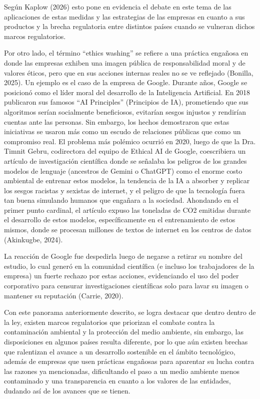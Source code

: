 \documentclass[stu,12pt,a4paper]{apa7}
\begin{document}
Según Kaplow (2026) esto pone en evidencia el debate en este tema de las aplicaciones de estas medidas y las estrategias de las empresas en cuanto a sus productos y la brecha regulatoria entre distintos países cuando se vulneran dichos marcos regulatorios.

Por otro lado, el término ``ethics washing'' se refiere a una práctica engañosa en donde las empresas exhiben una imagen pública de responsabilidad moral y de valores éticos, pero que en sus acciones internas reales no se ve reflejado (Bonilla, 2025). Un ejemplo es el caso de la empresa de Google. Durante años, Google se posicionó como el líder moral del desarrollo de la Inteligencia Artificial. En 2018 publicaron sus famosos ``AI Principles'' (Principios de IA), prometiendo que sus algoritmos serían socialmente beneficiosos, evitarían sesgos injustos y rendirían cuentas ante las personas. Sin embargo, los hechos demostraron que estas iniciativas se usaron más como un escudo de relaciones públicas que como un compromiso real. El problema más polémico ocurrió en 2020, luego de que la Dra. Timnit Gebru, codirectora del equipo de Ethical AI de Google, coescribiera un artículo de investigación científica donde se señalaba los peligros de los grandes modelos de lenguaje (ancestros de Gemini o ChatGPT) como el enorme costo ambiental de entrenar estos modelos, la tendencia de la IA a absorber y replicar los sesgos racistas y sexistas de internet, y el peligro de que la tecnología fuera tan buena simulando humanos que engañara a la sociedad. Ahondando en el primer punto cardinal, el artículo expuso las toneladas de CO2 emitidas durante el desarrollo de estos modelos, específicamente en el entrenamiento de estos mismos, donde se procesan millones de textos de internet en los centros de datos (Akinkugbe, 2024).

La reacción de Google fue despedirla luego de negarse a retirar su nombre del estudio, lo cual generó en la comunidad científica (e incluso los trabajadores de la empresa) un fuerte rechazo por estas acciones, evidenciando el uso del poder corporativo para censurar investigaciones científicas solo para lavar su imagen o mantener su reputación (Carrie, 2020).

Con este panorama anteriormente descrito, se logra destacar que dentro dentro de la ley, existen marcos regulatorios que priorizan el combate contra la contaminación ambiental y la protección del medio ambiente, sin embargo, las disposiciones en algunos países resulta diferente, por lo que aún existen brechas que ralentizan el avance a un desarrollo sostenible en el ámbito tecnológico, además de empresas que usen prácticas engañosas para aparentar su lucha contra las razones ya mencionadas, dificultando el paso a un medio ambiente menos contaminado y una transparencia en cuanto a los valores de las entidades, dudando así de los avances que se tienen.
\end{document}
